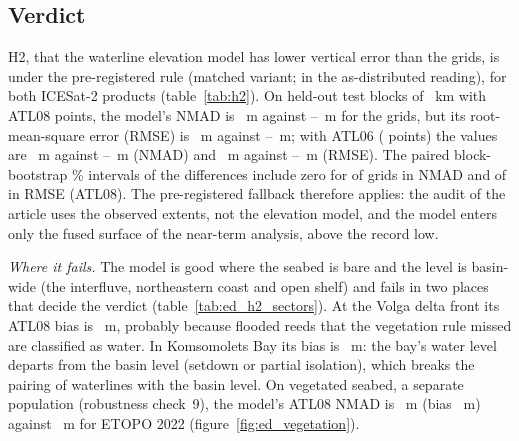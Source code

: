
\subsection*{Verdict}
H2, that the waterline elevation model has lower vertical error than the grids, is  under the pre-registered rule (matched variant;  in the as-distributed reading), for both ICESat-2 products (table~\ref{tab:h2}). On  held-out test blocks of ~km with  ATL08 points, the model's NMAD is ~m against --~m for the grids, but its root-mean-square error (RMSE) is ~m against --~m; with ATL06 ( points) the values are ~m against --~m (NMAD) and ~m against --~m (RMSE). The paired block-bootstrap \% intervals of the differences include zero for  of  grids in NMAD and  of  in RMSE (ATL08). The pre-registered fallback therefore applies: the audit of the article uses the observed extents, not the elevation model, and the model enters only the fused surface of the near-term analysis, above the record low.

\emph{Where it fails.} The model is good where the seabed is bare and the level is basin-wide (the interfluve, northeastern coast and open shelf) and fails in two places that decide the verdict (table~\ref{tab:ed_h2_sectors}). At the Volga delta front its ATL08 bias is ~m, probably because flooded reeds that the vegetation rule missed are classified as water. In Komsomolets Bay its bias is ~m: the bay's water level departs from the basin level (setdown or partial isolation), which breaks the pairing of waterlines with the basin level. On vegetated seabed, a separate population (robustness check~9), the model's ATL08 NMAD is ~m (bias ~m) against ~m for ETOPO 2022 (figure~\ref{fig:ed_vegetation}).

